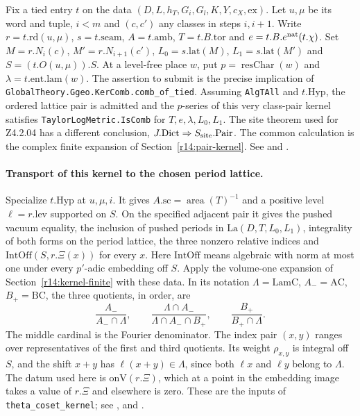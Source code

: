 Fix a tied entry $t$ on the data $(D,L,h_T,G_i,G_l,K,Y,c_X,\mathrm{ex})$.
Let $u,\mu$ be its word and tuple, $i<m$ and $(c,c')$ any classes
in steps $i,i+1$. Write $r=t.\mathrm{rd}(u,\mu)$, $s=t.\mathrm{seam}$,
$A=t.\mathrm{amb}$, $T=t.B.\mathrm{tor}$ and
$e=t.B.e^{\rm nat}(t.\chi)$. Set $M=r.N_i(c)$, $M'=r.N_{i+1}(c')$,
$L_0=s.\mathrm{lat}(M)$, $L_1=s.\mathrm{lat}(M')$ and
$S=(t.O(u,\mu)).S$. At a level-free place $w$, put
$p=\operatorname{resChar}(w)$ and $\lambda=t.\mathrm{ent}.\mathrm{lam}(w)$.
The assertion to submit is the precise implication of
\nolinkurl{GlobalTheory.Ggeo.KerComb.comb_of_tied}. Assuming
\nolinkurl{AlgTAll} and $t.\mathrm{Hyp}$, the ordered lattice pair is
admitted and the $p$-series of this very class-pair kernel satisfies
\nolinkurl{TaylorLogMetric.IsComb} for $T,e,\lambda,L_0,L_1$.
The site theorem used for Z4.2.04 has a different conclusion, $J.\mathrm{Dict}
\Rightarrow S_{\rm site}.\mathrm{Pair}$. The common calculation is
the complex finite expansion of Section~\ref{r14:pair-kernel}.
See  and
.

\paragraph{Transport of this kernel to the chosen period lattice.}
\label{r14:comb-seam}
Specialize $t.\mathrm{Hyp}$ at $u,\mu,i$. It gives
$A.\mathrm{sc}=\operatorname{area}(T)^{-1}$ and a positive level
$\ell=r.\mathrm{lev}$ supported on $S$. On the specified adjacent pair
it gives the pushed vacuum equality, the inclusion of pushed periods in
$\mathrm{La}(D,T,L_0,L_1)$, integrality of both forms on the period
lattice, the three nonzero relative indices and $\mathrm{IntOff}(S,r.\Xi(x))$
for every $x$. Here $\mathrm{IntOff}$ means algebraic with norm at most one
under every $p'$-adic embedding off $S$. Apply the volume-one expansion
of Section~\ref{r14:kernel-finite} with these data. In its notation
$\Lambda=\mathrm{LamC}$, $A_-=\mathrm{AC}$, $B_+=\mathrm{BC}$, the
three quotients, in order, are
\[
 \frac{A_-}{A_-\cap\Lambda},\qquad
 \frac{\Lambda\cap A_-}{\Lambda\cap A_-\cap B_+},\qquad
 \frac{B_+}{B_+\cap\Lambda}.
\]
The middle cardinal is the Fourier denominator. The index pair $(x,y)$
ranges over representatives of the first and third quotients. Its weight
$\rho_{x,y}$ is integral off $S$, and the shift $x+y$ has
$\ell(x+y)\in\Lambda$, since both $\ell x$ and $\ell y$ belong to
$\Lambda$. The datum used here is $\mathrm{onV}(r.\Xi)$, which at a
point in the embedding image takes a value of $r.\Xi$ and elsewhere
is zero. These are the inputs of \nolinkurl{theta_coset_kernel};
see ,
 and
.

